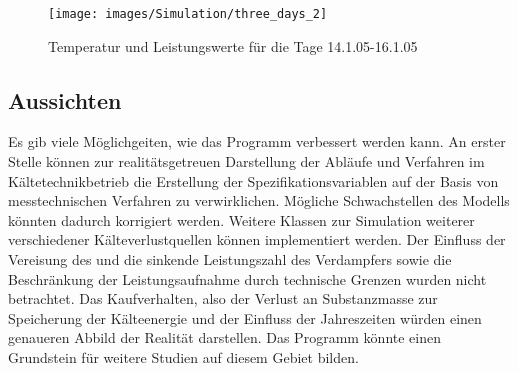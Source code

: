 \begin{figure}[h]
\begin{center}
\texttt{[image: images/Simulation/three\_days\_2]}
\end{center}
\vspace{-25pt}
\caption{Temperatur und Leistungswerte f\"ur die Tage 14.1.05-16.1.05}
\label{fig:threet}
\end{figure}

\subsection*{Aussichten}

Es gib viele M\"oglichgeiten, wie das Programm verbessert werden kann. An erster
Stelle k\"onnen zur realit\"atsgetreuen Darstellung der Abl\"aufe und Verfahren
im K\"altetechnikbetrieb die Erstellung der Spezifikationsvariablen auf der
Basis von messtechnischen Verfahren zu verwirklichen. M\"ogliche Schwachstellen
des Modells k\"onnten dadurch korrigiert werden. Weitere Klassen zur Simulation
weiterer verschiedener K\"alteverlustquellen k\"onnen implementiert werden. Der
Einfluss der Vereisung des und die sinkende Leistungszahl des Verdampfers sowie
die Beschr\"ankung der Leistungsaufnahme durch technische Grenzen wurden nicht
betrachtet. Das Kaufverhalten, also der Verlust an Substanzmasse zur Speicherung
der K\"alteenergie und der Einfluss der Jahreszeiten w\"urden einen genaueren
Abbild der Realit\"at darstellen. Das Programm k\"onnte einen Grundstein f\"ur
weitere Studien auf diesem Gebiet bilden.

